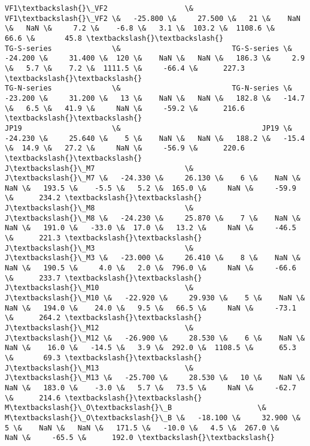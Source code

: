 \documentclass{article}
\begin{document}
\begin{Verbatim}[commandchars=\\\{\}]
VF1\textbackslash{}\_VF2                  \&                              VF1\textbackslash{}\_VF2 \&   -25.800 \&     27.500 \&   21 \&    NaN \&   NaN \&     7.2 \&    -6.8 \&   3.1 \&  103.2 \&  1108.6 \&      66.6 \&       45.8 \textbackslash{}\textbackslash{}
TG-S-series              \&                          TG-S-series \&   -24.200 \&     31.400 \&  120 \&    NaN \&   NaN \&   186.3 \&     2.9 \&   5.7 \&    7.2 \&  1111.5 \&     -66.4 \&      227.3 \textbackslash{}\textbackslash{}
TG-N-series              \&                          TG-N-series \&   -23.200 \&     31.200 \&   13 \&    NaN \&   NaN \&   182.8 \&   -14.7 \&   6.5 \&   41.9 \&     NaN \&     -59.2 \&      216.6 \textbackslash{}\textbackslash{}
JP19                     \&                                 JP19 \&   -24.230 \&     25.640 \&    5 \&    NaN \&   NaN \&   188.2 \&   -15.4 \&  14.9 \&   27.2 \&     NaN \&     -56.9 \&      220.6 \textbackslash{}\textbackslash{}
J\textbackslash{}\_M7                     \&                                 J\textbackslash{}\_M7 \&   -24.330 \&     26.130 \&    6 \&    NaN \&   NaN \&   193.5 \&    -5.5 \&   5.2 \&  165.0 \&     NaN \&     -59.9 \&      234.2 \textbackslash{}\textbackslash{}
J\textbackslash{}\_M8                     \&                                 J\textbackslash{}\_M8 \&   -24.230 \&     25.870 \&    7 \&    NaN \&   NaN \&   191.0 \&   -33.0 \&  17.0 \&   13.2 \&     NaN \&     -46.5 \&      221.3 \textbackslash{}\textbackslash{}
J\textbackslash{}\_M3                     \&                                 J\textbackslash{}\_M3 \&   -23.000 \&     26.410 \&    8 \&    NaN \&   NaN \&   190.5 \&     4.0 \&   2.0 \&  796.0 \&     NaN \&     -66.6 \&      233.7 \textbackslash{}\textbackslash{}
J\textbackslash{}\_M10                    \&                                J\textbackslash{}\_M10 \&   -22.920 \&     29.930 \&    5 \&    NaN \&   NaN \&   194.0 \&    24.0 \&   9.5 \&   66.5 \&     NaN \&     -73.1 \&      264.2 \textbackslash{}\textbackslash{}
J\textbackslash{}\_M12                    \&                                J\textbackslash{}\_M12 \&   -26.900 \&     28.530 \&    6 \&    NaN \&   NaN \&    16.0 \&   -14.5 \&   3.9 \&  292.0 \&  1108.5 \&      65.3 \&       69.3 \textbackslash{}\textbackslash{}
J\textbackslash{}\_M13                    \&                                J\textbackslash{}\_M13 \&   -25.700 \&     28.530 \&   10 \&    NaN \&   NaN \&   183.0 \&    -3.0 \&   5.7 \&   73.5 \&     NaN \&     -62.7 \&      214.6 \textbackslash{}\textbackslash{}
M\textbackslash{}\_O\textbackslash{}\_B                    \&                                M\textbackslash{}\_O\textbackslash{}\_B \&   -18.100 \&     32.900 \&    5 \&    NaN \&   NaN \&   171.5 \&   -10.0 \&   4.5 \&  267.0 \&     NaN \&     -65.5 \&      192.0 \textbackslash{}\textbackslash{}

\end{Verbatim}
\end{document}
